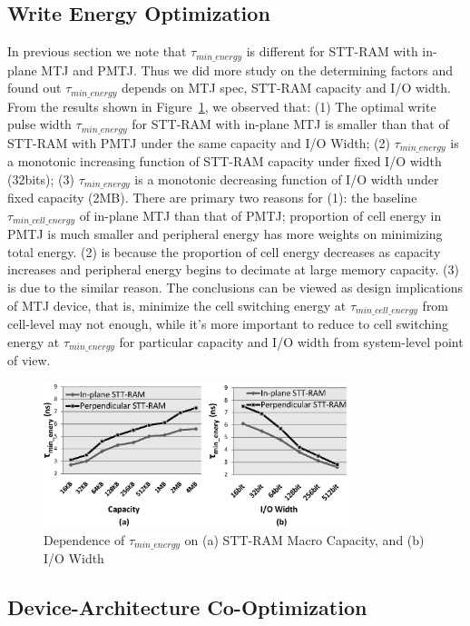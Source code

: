 \subsection{Write Energy Optimization}
In previous section we note that $\tau_{min\_energy}$ is different for STT-RAM with in-plane MTJ and PMTJ. Thus we did more study on the determining factors and found out $\tau_{min\_energy}$ depends on MTJ spec, STT-RAM capacity and I/O width. From the results shown in Figure~\ref{fig:minenergy}, we observed that: (1) The optimal write pulse width $\tau_{min\_energy}$ for STT-RAM with in-plane MTJ is smaller than that of STT-RAM with PMTJ under the same capacity and I/O Width; (2) $\tau_{min\_energy}$ is a monotonic increasing function of STT-RAM capacity under fixed I/O width (32bits); (3) $\tau_{min\_energy}$ is a monotonic decreasing function of I/O width under fixed capacity (2MB). There are primary two reasons for (1): the baseline $\tau_{min\_cell\_energy}$ of in-plane MTJ than that of PMTJ; proportion of cell energy in PMTJ is much smaller and peripheral energy has more weights on minimizing total energy. (2) is because the proportion of cell energy decreases as capacity increases and peripheral energy begins to decimate at large memory capacity. (3) is due to the similar reason. The conclusions can be viewed as design implications of MTJ device, that is, minimize the cell switching energy at $\tau_{min\_cell\_energy}$ from cell-level may not enough, while it's more important to reduce to cell switching energy at $\tau_{min\_energy}$ for particular capacity and I/O width from system-level point of view.

\begin{figure}[t]
  \centering
  \includegraphics[width=3.5in]{fig/MinEnergy.eps}
  \vspace{-10pt}
  \caption{Dependence of $\tau_{min\_energy}$ on (a) STT-RAM Macro Capacity, and (b) I/O Width}
  \label{fig:minenergy}
  \vspace{-15pt}
\end{figure}

\subsection{Device-Architecture Co-Optimization}

